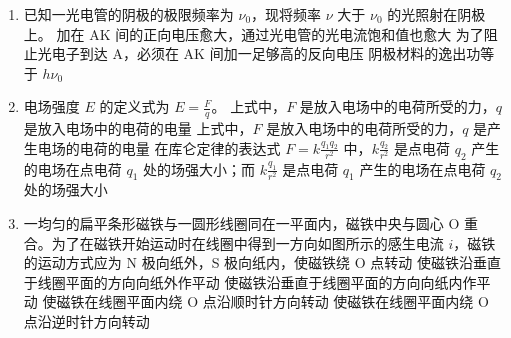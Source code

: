 \documentclass[\gkver]{gaokaozhenti}
\begin{document}
\begin{enumerate}

\item
已知一光电管的阴极的极限频率为 $\nu_{0}$，现将频率 $\nu$ 大于 $\nu_{0}$ 的光照射在阴极上。
{加在 AK 间的正向电压愈大，通过光电管的光电流饱和值也愈大}
{为了阻止光电子到达 A，必须在 AK 间加一足够高的反向电压}
{阴极材料的逸出功等于 $h\nu_{0}$}


\item
电场强度 $E$ 的定义式为 $E=\frac{F}{q}$。
{上式中，$F$ 是放入电场中的电荷所受的力，$q$ 是放入电场中的电荷的电量}
{上式中，$F$ 是放入电场中的电荷所受的力，$q$ 是产生电场的电荷的电量}
{在库仑定律的表达式 $F=k\frac{q_{1}q_{2}}{r^{2}}$ 中，$k\frac{q_{2}}{r^{2}}$ 是点电荷 $q_{2}$ 产生的电场在点电荷 $q_{1}$ 处的场强大小；而 $k\frac{q_{1}}{r^{2}}$ 是点电荷 $q_{1}$ 产生的电场在点电荷 $q_{2}$ 处的场强大小}


\item
一均匀的扁平条形磁铁与一圆形线圈同在一平面内，磁铁中央与圆心 O 重合。为了在磁铁开始运动时在线圈中得到一方向如图所示的感生电流 $i$，磁铁的运动方式应为
{N 极向纸外，S 极向纸内，使磁铁绕 O 点转动}
{使磁铁沿垂直于线圈平面的方向向纸外作平动}
{使磁铁沿垂直于线圈平面的方向向纸内作平动}
{使磁铁在线圈平面内绕 O 点沿顺时针方向转动}
{使磁铁在线圈平面内绕 O 点沿逆时针方向转动}


\end{enumerate}
\end{document}
